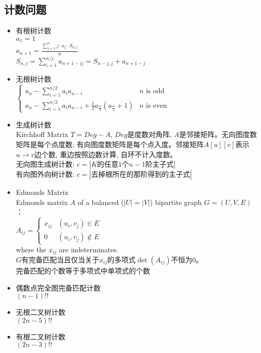     \subsection*{计数问题}
        \begin{itemize}[wide=0pt]
            \item 有根树计数
                \\$ a_1 = 1 $
                \\$ a_{n + 1} = \frac{\sum\limits_{j = 1}^{n} j \cdot a_j \cdot S_{n, j}}{n} $
                \\$ S_{n, j} = \sum\limits_{i = 1}^{n / j} a_{n + 1 - ij} = S_{n - j, j} + a_{n + 1 - j} $
            \item 无根树计数
                \\$ \begin{cases}
                    a_n - \sum\limits_{i = 1}^{n / 2} a_i a_{n - i} & n \text{ is odd}\\
                    a_n - \sum\limits_{i = 1}^{n / 2} a_i a_{n - i} + \frac{1}{2} a_{\frac{n}{2}} (a_{\frac{n}{2}} + 1) & n \text{ is even}
                \end{cases} $
            \item 生成树计数
                \\Kirchhoff Matrix $ T = Deg − A $, $ Deg $是度数对角阵, $ A $是邻接矩阵。无向图度数矩阵是每个点度数; 有向图度数矩阵是每个点入度。邻接矩阵$ A[u][v] $表示$ u \to v $边个数, 重边按照边数计算, 自环不计入度数。
                \\无向图生成树计数: $ c = \left|K\text{的任意}1\text{个}n−1\text{阶主子式}\right| $
                \\有向图外向树计数: $ c = \left|\text{去掉根所在的那阶得到的主子式}\right| $
            \item Edmonds Matrix
                \\Edmonds matrix $ A $ of a balanced ($ \left| U \right| = \left| V \right| $) bipartite graph $ G = (U, V, E) $：
                \\$ A_{ij} = \begin{cases}
                    x_{ij} & (u_i, v_j) \in E\\
                    0 & (u_i, v_j) \notin E
                \end{cases} $
                \\where the $ x_{ij} $ are indeterminates.
                \\$ G $有完备匹配当且仅当关于$ x_{ij} $的多项式$ \det(A_{ij}) $不恒为$ 0 $。
                \\完备匹配的个数等于多项式中单项式的个数
            \item 偶数点完全图完备匹配计数
                \\$ (n - 1)!! $
            \item 无根二叉树计数
                \\$ (2n - 5)!! $
            \item 有根二叉树计数
                \\$ (2n - 3)!! $
        \end{itemize}
